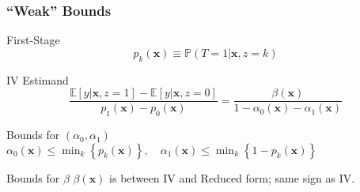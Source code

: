 \documentclass[handout]{beamer}
\begin{document}
%
\begin{frame}[label=BOUNDS_BODY]
  \frametitle{``Weak'' Bounds}

  \begin{block}{First-Stage}
    \vspace{-2em}
    \[p_k(\mathbf{x}) \equiv  \mathbb{P}(T=1|\mathbf{x},z=k)\]
  \end{block}

  \begin{block}{IV Estimand}
    \vspace{-0.5em}
    \[\displaystyle\frac{\mathbb{E}[y|\mathbf{x},z=1] - \mathbb{E}[y|\mathbf{x},z=0]}{p_1(\mathbf{x}) - p_0(\mathbf{x})} = \frac{\beta(\mathbf{x})}{1 - \alpha_0(\mathbf{x}) - \alpha_1(\mathbf{x})}\]
  \end{block}

  \begin{block}{Bounds for $(\alpha_0, \alpha_1)$}
    $\alpha_0(\mathbf{x}) \leq \min_k \left\{ p_k(\mathbf{x}) \right\}, \quad \alpha_1(\mathbf{x}) \leq \min_k\left\{ 1 - p_k(\mathbf{x}) \right\}$ \hyperlink{BOUNDS_APPEND}{}
  \end{block}


  \begin{alertblock}{Bounds for $\beta$}
    $\beta(\mathbf{x})$ is between IV and Reduced form; same sign as IV. \hyperlink{IV_APPEND}{}
  \end{alertblock}


\end{frame}
\end{document}
